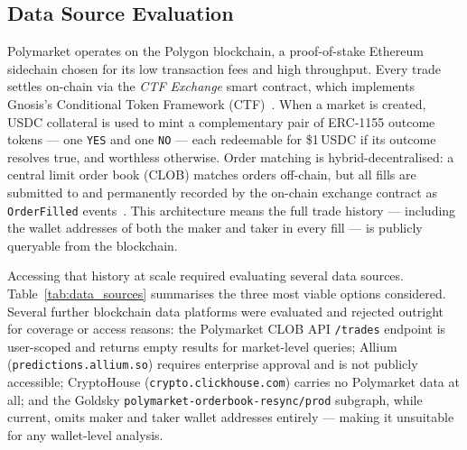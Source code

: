 \subsection{Data Source Evaluation}
\label{sec:data_sources}

Polymarket operates on the Polygon blockchain, a proof-of-stake Ethereum
sidechain chosen for its low transaction fees and high throughput.
Every trade settles on-chain via the \textit{CTF Exchange} smart contract,
which implements Gnosis's Conditional Token Framework (CTF)~\cite{polymarket_ctf}.
When a market is created, USDC collateral is used to mint a complementary
pair of ERC-1155 outcome tokens — one \texttt{YES} and one \texttt{NO} —
each redeemable for \$1\,USDC if its outcome resolves true, and worthless
otherwise.
Order matching is hybrid-decentralised: a central limit order book (CLOB)
matches orders off-chain, but all fills are submitted to and permanently
recorded by the on-chain exchange contract as \texttt{OrderFilled}
events~\cite{polymarket_docs}.
This architecture means the full trade history — including the wallet
addresses of both the maker and taker in every fill — is publicly
queryable from the blockchain.

Accessing that history at scale required evaluating several data sources.
Table~\ref{tab:data_sources} summarises the three most viable options
considered.
Several further blockchain data platforms were evaluated and rejected
outright for coverage or access reasons: the Polymarket CLOB API
\texttt{/trades} endpoint is user-scoped and returns empty results for
market-level queries; Allium (\texttt{predictions.allium.so}) requires
enterprise approval and is not publicly accessible; CryptoHouse
(\texttt{crypto.clickhouse.com}) carries no Polymarket data at all;
and the Goldsky \texttt{polymarket-orderbook-resync/prod} subgraph,
while current, omits maker and taker wallet addresses entirely —
making it unsuitable for any wallet-level analysis.

